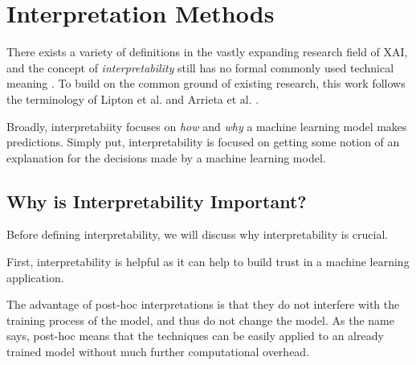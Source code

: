 \section{Interpretation Methods}
\label{sec:interpretation_methods}

There exists a variety of definitions in the vastly expanding research field of XAI, and the concept of \textit{interpretability} still has no formal commonly used technical meaning \cite{lipton2018mythos}. To build on the common ground of existing research, this work follows the terminology of Lipton et al. \cite{lipton2018mythos} and Arrieta et al. \cite{arrieta2020explainable}.

Broadly, interpretabiity focuses on \textit{how} and \textit{why} a machine learning model makes predictions.
Simply put, interpretability is focused on getting some notion of an explanation for the decisions made by a machine learning model.

\subsection{Why is Interpretability Important?}
\label{subsec:importance_of_interpretability}
Before defining interpretability, we will discuss why interpretability is crucial. 

First, interpretability is helpful as it can help to build trust in a machine learning application. 

The advantage of post-hoc interpretations is that they do not interfere with the training process of the model, and thus do not change the model. As the name says, post-hoc means that the techniques can be easily applied to an already trained model without much further computational overhead. 

